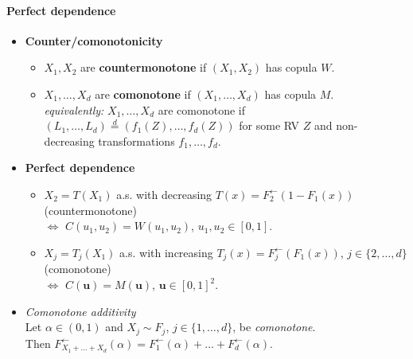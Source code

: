 \documentclass[a4paper,landscape,8pt,fleqn]{scrartcl}
\renewcommand{\emph}[1]{\textbf{#1}}
\begin{document}
\begin{multicols*}{3}
\paragraph{Perfect dependence}
\begin{itemize}
\item \emph{Counter/comonotonicity}
\begin{itemize}
\item $X_1, X_2$ are \emph{countermonotone} if $(X_1, X_2)$ has copula $W$.
\item $X_1, \ldots, X_d$ are \emph{comonotone} if $(X_1, \ldots, X_d)$ has copula $M$. \\
\textit{equivalently:} $X_1, \ldots, X_d$ are comonotone if $(L_1, \ldots, L_d) \overset{d}{=} (f_1(Z), \ldots, f_d(Z))$ for some RV $Z$ and non-decreasing transformations $f_1, \ldots, f_d$.
\end{itemize}
\item \emph{Perfect dependence}
\begin{itemize}
\item $X_2 = T(X_1)$ a.s. with decreasing $T(x) = F_2^\leftarrow(1-F_1(x))$ (countermonotone) \\
$\iff$ $C(u_1, u_2) = W(u_1, u_2)$, $u_1, u_2 \in [0,1]$.
\item $X_j = T_j(X_1)$ a.s. with increasing $T_j(x) = F_j^\leftarrow(F_1(x))$, $j \in \lbrace2, \ldots, d \rbrace$ (comonotone) \\
$\iff$ $C(\bm u) = M(\bm u)$, $\bm u \in [0,1]^2$.
\end{itemize}
\item \textit{Comonotone additivity} \\
Let $\alpha \in (0,1)$ and $X_j \sim F_j$, $j \in \lbrace 1, \ldots, d \rbrace$, be \textit{comonotone}. \\
Then $F_{X_1 + \ldots + X_d}^\leftarrow(\alpha) = F_1^\leftarrow(\alpha) + \ldots + F_d^\leftarrow(\alpha)$.
\end{itemize}


\end{multicols*}
\end{document}

